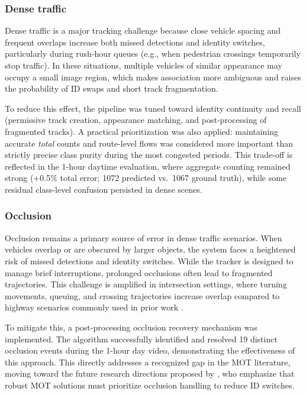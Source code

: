 \subsubsection{Dense traffic}

Dense traffic is a major tracking challenge because close vehicle spacing and frequent overlaps increase both missed detections and identity switches, particularly during rush-hour queues (e.g., when pedestrian crossings temporarily stop traffic). In these situations, multiple vehicles of similar appearance may occupy a small image region, which makes association more ambiguous and raises the probability of ID swaps and short track fragmentation.

To reduce this effect, the pipeline was tuned toward identity continuity and recall (permissive track creation, appearance matching, and post-processing of fragmented tracks). A practical prioritization was also applied: maintaining accurate \emph{total} counts and route-level flows was considered more important than strictly precise class purity during the most congested periods. This trade-off is reflected in the 1-hour daytime evaluation, where aggregate counting remained strong (+0.5\% total error; 1072 predicted vs.\ 1067 ground truth), while some residual class-level confusion persisted in dense scenes.

\subsubsection{Occlusion}
Occlusion remains a primary source of error in dense traffic scenarios. When vehicles overlap or are obscured by larger objects, the system faces a heightened risk of missed detections and identity switches. While the tracker is designed to manage brief interruptions, prolonged occlusions often lead to fragmented trajectories. This challenge is amplified in intersection settings, where turning movements, queuing, and crossing trajectories increase overlap compared to highway scenarios commonly used in prior work \citep{Song2019VisionBasedVehicle,Neupane2022RealTimeVehicle}.

To mitigate this, a post-processing occlusion recovery mechanism was implemented. The algorithm successfully identified and resolved 19 distinct occlusion events during the 1-hour day video, demonstrating the effectiveness of this approach. This directly addresses a recognized gap in the MOT literature, moving toward the future research directions proposed by \citet{Hassan2024}, who emphasize that robust MOT solutions must prioritize occlusion handling to reduce ID switches.

